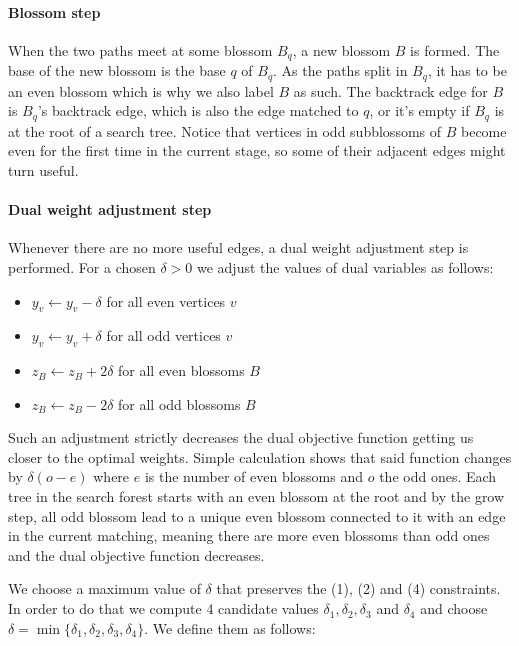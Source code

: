 \paragraph*{Blossom step}

When the two paths meet at some blossom $B_q$, a new blossom $B$ is formed. The base of the new blossom is the base $q$ of $B_q$. As the paths split in $B_q$, it has to be an even blossom which is why we also label $B$ as such. The backtrack edge for $B$ is $B_q$'s backtrack edge, which is also the edge matched to $q$, or it's empty if $B_q$ is at the root of a search tree. Notice that vertices in odd subblossoms of $B$ become even for the first time in the current stage, so some of their adjacent edges might turn useful.

\paragraph*{Dual weight adjustment step}

Whenever there are no more useful edges, a dual weight adjustment step is performed. For a chosen $\delta > 0$ we adjust the values of dual variables as follows:

\begin{itemize}
    \item $y_v \gets y_v - \delta$ for all even vertices $v$
    \item $y_v \gets y_v + \delta$ for all odd vertices $v$
    \item $z_B \gets z_B + 2\delta$ for all even blossoms $B$
    \item $z_B \gets z_B - 2\delta$ for all odd blossoms $B$
\end{itemize}

Such an adjustment strictly decreases the dual objective function getting us closer to the optimal weights. Simple calculation shows that said function changes by $\delta(o - e)$ where $e$ is the number of even blossoms and $o$ the odd ones. Each tree in the search forest starts with an even blossom at the root and by the grow step, all odd blossom lead to a unique even blossom connected to it with an edge in the current matching, meaning there are more even blossoms than odd ones and the dual objective function decreases.

We choose a maximum value of $\delta$ that preserves the (1), (2) and (4) constraints. In order to do that we compute 4 candidate values $\delta_1, \delta_2, \delta_3$ and $\delta_4$ and choose $\delta = \min \{\delta_1, \delta_2, \delta_3, \delta_4\}$. We define them as follows:

